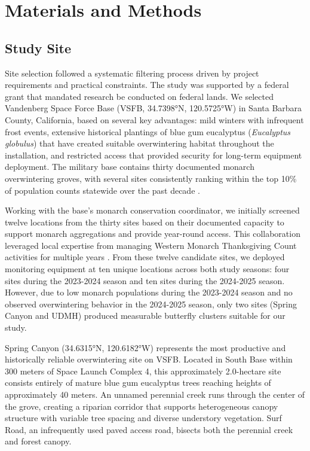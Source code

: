 \section{Materials and Methods}

\subsection{Study Site}

Site selection followed a systematic filtering process driven by project requirements and practical constraints. The study was supported by a federal grant that mandated research be conducted on federal lands. We selected Vandenberg Space Force Base (VSFB, 34.7398°N, 120.5725°W) in Santa Barbara County, California, based on several key advantages: mild winters with infrequent frost events, extensive historical plantings of blue gum eucalyptus (\textit{Eucalyptus globulus}) that have created suitable overwintering habitat throughout the installation, and restricted access that provided security for long-term equipment deployment. The military base contains thirty documented monarch overwintering groves, with several sites consistently ranking within the top 10\% of population counts statewide over the past decade \parencite{xercessocietyWesternMonarchButterfly2025}. 

Working with the base's monarch conservation coordinator, we initially screened twelve locations from the thirty sites based on their documented capacity to support monarch aggregations and provide year-round access. This collaboration leveraged local expertise from managing Western Monarch Thanksgiving Count activities for multiple years \parencite{xercessocietyWesternMonarchButterfly2025}. From these twelve candidate sites, we deployed monitoring equipment at ten unique locations across both study seasons: four sites during the 2023-2024 season and ten sites during the 2024-2025 season. However, due to low monarch populations during the 2023-2024 season and no observed overwintering behavior in the 2024-2025 season, only two sites (Spring Canyon and UDMH) produced measurable butterfly clusters suitable for our study.

Spring Canyon (34.6315°N, 120.6182°W) represents the most productive and historically reliable overwintering site on VSFB. Located in South Base within 300 meters of Space Launch Complex 4, this approximately 2.0-hectare site consists entirely of mature blue gum eucalyptus trees reaching heights of approximately 40 meters. An unnamed perennial creek runs through the center of the grove, creating a riparian corridor that supports heterogeneous canopy structure with variable tree spacing and diverse understory vegetation. Surf Road, an infrequently used paved access road, bisects both the perennial creek and forest canopy. 

